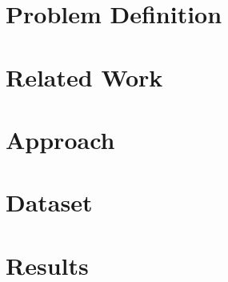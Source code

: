 \documentclass[a4paper]{report}
\begin{document}
\section{Problem Definition}
\section{Related Work}
\section{Approach}
\section{Dataset}
\section{Results}
\end{document}
